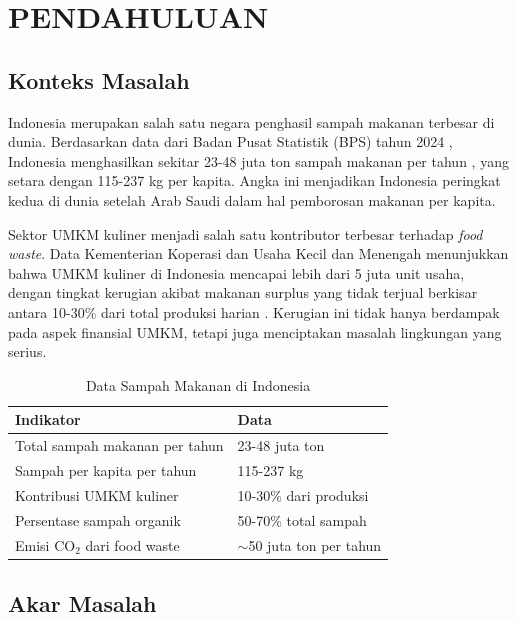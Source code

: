 \section{PENDAHULUAN}

\subsection{Konteks Masalah}

Indonesia merupakan salah satu negara penghasil sampah makanan terbesar di dunia. Berdasarkan data dari Badan Pusat Statistik (BPS) tahun 2024 \cite{bps2024lingkungan}, Indonesia menghasilkan sekitar 23-48 juta ton sampah makanan per tahun \cite{indonesiapolicy2025}, yang setara dengan 115-237 kg per kapita. Angka ini menjadikan Indonesia peringkat kedua di dunia setelah Arab Saudi dalam hal pemborosan makanan per kapita.

Sektor UMKM kuliner menjadi salah satu kontributor terbesar terhadap \textit{food waste}. Data Kementerian Koperasi dan Usaha Kecil dan Menengah \cite{kemenkopukm2024} menunjukkan bahwa UMKM kuliner di Indonesia mencapai lebih dari 5 juta unit usaha, dengan tingkat kerugian akibat makanan surplus yang tidak terjual berkisar antara 10-30\% dari total produksi harian \cite{donatfitri2026}. Kerugian ini tidak hanya berdampak pada aspek finansial UMKM, tetapi juga menciptakan masalah lingkungan yang serius.

\begin{table}[H]
\centering
\caption{Data Sampah Makanan di Indonesia}
\label{tab:data_sampah}
\begin{tabularx}{\textwidth}{|l|X|}
\hline
\textbf{Indikator} & \textbf{Data} \\
\hline
Total sampah makanan per tahun & 23-48 juta ton \\
\hline
Sampah per kapita per tahun & 115-237 kg \\
\hline
Kontribusi UMKM kuliner & 10-30\% dari produksi \\
\hline
Persentase sampah organik & 50-70\% total sampah \\
\hline
Emisi CO$_2$ dari food waste & $\sim$50 juta ton per tahun \\
\hline
\end{tabularx}
\end{table}

\subsection{Akar Masalah}

